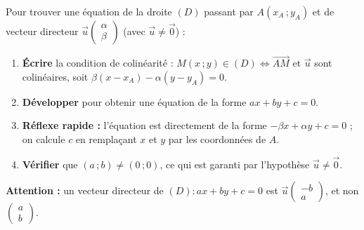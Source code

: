 \documentclass[11pt]{article}
\begin{document}
\begin{methode}
Pour trouver une équation de la droite $(D)$ passant par $A(x_A\,;y_A)$ et de vecteur directeur $\vec{u}\begin{pmatrix} \alpha \\ \beta \end{pmatrix}$ (avec $\vec{u} \neq \vec{0}$) :
\begin{enumerate}
\item \textbf{Écrire} la condition de colinéarité : $M(x\,;y) \in (D) \iff \overrightarrow{AM}$ et $\vec{u}$ sont colinéaires, soit $\beta(x - x_A) - \alpha(y - y_A) = 0$.
\item \textbf{Développer} pour obtenir une équation de la forme $ax + by + c = 0$.
\item \textbf{Réflexe rapide :} l'équation est directement de la forme $-\beta x + \alpha y + c = 0$ ; on calcule $c$ en remplaçant $x$ et $y$ par les coordonnées de $A$.
\item \textbf{Vérifier} que $(a\,;b) \neq (0\,;0)$, ce qui est garanti par l'hypothèse $\vec{u} \neq \vec{0}$.
\end{enumerate}
\textbf{Attention :} un vecteur directeur de $(D) : ax + by + c = 0$ est $\vec{u}\begin{pmatrix} -b \\ a \end{pmatrix}$, et non $\begin{pmatrix} a \\ b \end{pmatrix}$.
\end{methode}
\end{document}
